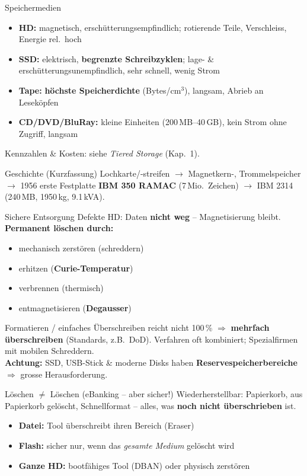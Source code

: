 \documentclass[a4paper, fontsize=7pt]{scrartcl}
\begin{document}
\begin{mainbox}{Speichermedien}
\begin{itemize}
    \item \textbf{HD:} magnetisch, erschütterungsempfindlich; rotierende Teile,
          Verschleiss, Energie rel.\ hoch
    \item \textbf{SSD:} elektrisch, \textbf{begrenzte Schreibzyklen}; lage- \&
          erschütterungsunempfindlich, sehr schnell, wenig Strom
    \item \textbf{Tape:} \textbf{höchste Speicherdichte} (Bytes/cm$^3$), langsam,
          Abrieb an Leseköpfen
    \item \textbf{CD/DVD/BluRay:} kleine Einheiten (200\,MB--40\,GB), kein Strom
          ohne Zugriff, langsam
\end{itemize}
Kennzahlen \& Kosten: siehe \emph{Tiered Storage} (Kap.\ 1).
\end{mainbox}

\begin{subbox}{Geschichte (Kurzfassung)}
Lochkarte/-streifen $\to$ Magnetkern-, Trommelspeicher $\to$ 1956 erste
Festplatte \textbf{IBM 350 RAMAC} (7\,Mio.\ Zeichen) $\to$ IBM 2314
(240\,MB, 1950\,kg, 9.1\,kVA).
\end{subbox}

\begin{mainbox}{Sichere Entsorgung}
Defekte HD: Daten \textbf{nicht weg} -- Magnetisierung bleibt.\\
\textbf{Permanent löschen durch:}
\begin{itemize}
    \item mechanisch zerstören (schreddern)
    \item erhitzen (\textbf{Curie-Temperatur})
    \item verbrennen (thermisch)
    \item entmagnetisieren (\textbf{Degausser})
\end{itemize}
Formatieren / einfaches Überschreiben reicht nicht 100\,\% $\Rightarrow$
\textbf{mehrfach überschreiben} (Standards, z.B.\ DoD). Verfahren oft
kombiniert; Spezialfirmen mit mobilen Schreddern.\\
\textbf{Achtung:} SSD, USB-Stick \& moderne Disks haben
\textbf{Reservespeicherbereiche} $\Rightarrow$ grosse Herausforderung.
\end{mainbox}

\begin{subbox}{Löschen $\neq$ Löschen (eBanking -- aber sicher!)}
Wiederherstellbar: Papierkorb, aus Papierkorb gelöscht, Schnellformat -- alles,
was \textbf{noch nicht überschrieben} ist.
\begin{itemize}
    \item \textbf{Datei:} Tool überschreibt ihren Bereich (Eraser)
    \item \textbf{Flash:} sicher nur, wenn das \emph{gesamte Medium} gelöscht
          wird
    \item \textbf{Ganze HD:} bootfähiges Tool (DBAN) oder physisch zerstören
\end{itemize}
\end{subbox}
\end{document}
